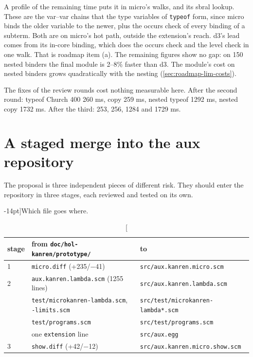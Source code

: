 A profile of the remaining time puts it in micro's walks,  and its sbral
lookup. These are the var--var chains that the type variables of \texttt{typeof} form, since micro binds
the older variable to the newer, plus the occurs check of every binding of a subterm. Both are on micro's
hot path, outside the extension's reach. d3's lead comes from its in-core binding, which does the occurs
check and the level check in one walk. That is roadmap item (a). The remaining figures show no gap: on
150 nested binders the final module is 2--8\% faster than d3. The module's cost on nested binders grows
quadratically with the nesting (\cref{sec:roadmap-lim-costs}).

The fixes of the review rounds cost nothing measurable here. After the second round: typeof Church 400
260 ms, copy 259 ms, nested typeof 1292 ms, nested copy 1732 ms. After the third: 253, 256, 1284 and
1729 ms.

\section{A staged merge into the aux repository}\label{sec:roadmap-merge}

The proposal is three independent pieces of different risk. They should enter the repository in three
stages, each reviewed and tested on its own.

\begin{table}[h]
\small
\caption[][-14pt]{Which file goes where.}\label{tab:roadmap-files}
\begin{tabular}{@{}lll@{}}
\toprule
stage & from \texttt{doc/hol-kanren/prototype/} & to \\
\midrule
1 & \texttt{micro.diff} (+235/−41) & \texttt{src/aux.kanren.micro.scm} \\
2 & \texttt{aux.kanren.lambda.scm} (1255 lines) & \texttt{src/aux.kanren.lambda.scm} \\
  & \texttt{test/microkanren-lambda.scm}, \texttt{-limits.scm} & \texttt{src/test/microkanren-lambda*.scm} \\
  & \texttt{test/programs.scm} & \texttt{src/test/programs.scm} \\
  & one \texttt{extension} line & \texttt{src/aux.egg} \\
3 & \texttt{show.diff} (+42/−12) & \texttt{src/aux.kanren.micro.show.scm} \\
\bottomrule
\end{tabular}\par\vspace{20pt}
\end{table}

